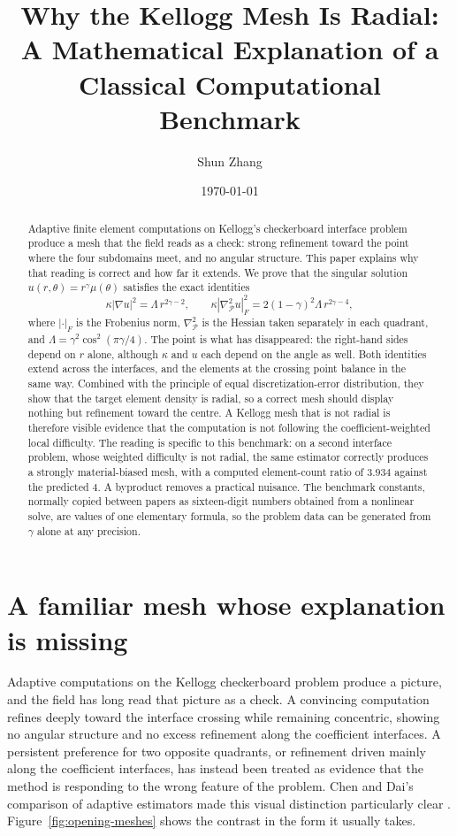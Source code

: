 \documentclass[10pt,pdftex]{amsart}%
\title[Why the Kellogg Mesh Is Radial]{Why the Kellogg Mesh Is Radial: A Mathematical Explanation of a Classical Computational Benchmark}
\author[S. Zhang]{Shun Zhang}
\date{\today}
\numberwithin{equation}{section}
\newcommand{\Pcal}{\mathcal{P}}
\newcommand{\gradb}{\nabla_{\Pcal}}
\begin{document}
\begin{abstract}
Adaptive finite element computations on Kellogg's checkerboard interface problem produce a mesh that the field reads as a check: strong refinement toward the point where the four subdomains meet, and no angular structure.  This paper explains why that reading is correct and how far it extends.  We prove that the singular solution $u(r,\theta)=r^\gamma\mu(\theta)$ satisfies the exact identities
\[
  \kappa|\nabla u|^2=\Lambda\, r^{2\gamma-2},
  \qquad
  \kappa|\gradb^2u|_F^2 =2(1-\gamma)^2\Lambda\, r^{2\gamma-4},
\]
where $|\cdot|_F$ is the Frobenius norm, $\gradb^2$ is the Hessian taken separately in each quadrant, and $\Lambda=\gamma^2\cos^2(\pi\gamma/4)$.  The point is what has disappeared: the right-hand sides depend on $r$ alone, although $\kappa$ and $u$ each depend on the angle as well.  Both identities extend across the interfaces, and the elements at the crossing point balance in the same way.  Combined with the principle of equal discretization-error distribution, they show that the target element density is radial, so a correct mesh should display nothing but refinement toward the centre.  A Kellogg mesh that is not radial is therefore visible evidence that the computation is not following the coefficient-weighted local difficulty.  The reading is specific to this benchmark: on a second interface problem, whose weighted difficulty is not radial, the same estimator correctly produces a strongly material-biased mesh, with a computed element-count ratio of $3.934$ against the predicted $4$.  A byproduct removes a practical nuisance.  The benchmark constants, normally copied between papers as sixteen-digit numbers obtained from a nonlinear solve, are values of one elementary formula, so the problem data can be generated from $\gamma$ alone at any precision.
\end{abstract}

\maketitle

\section{A familiar mesh whose explanation is missing}
\label{sec:intro}

Adaptive computations on the Kellogg checkerboard problem produce a picture, and the field has long read that picture as a check.  A convincing computation refines deeply toward the interface crossing while remaining concentric, showing no angular structure and no excess refinement along the coefficient interfaces.  A persistent preference for two opposite quadrants, or refinement driven mainly along the coefficient interfaces, has instead been treated as evidence that the method is responding to the wrong feature of the problem.  Chen and Dai's comparison of adaptive estimators made this visual distinction particularly clear \cite{ChenDai}.  Figure~\ref{fig:opening-meshes} shows the contrast in the form it usually takes.
\end{document}
